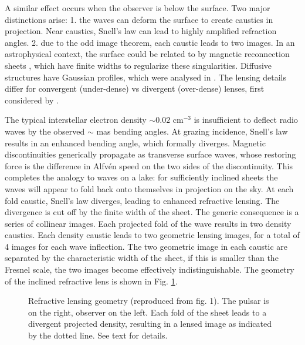 \documentclass[useAMS,usenatbib]{mn2e}
\begin{document}
A similar effect occurs when the
observer is below the surface.  Two major distinctions arise: 1. the
waves can deform the surface to create caustics in projection. Near
caustics, Snell's law can lead to highly amplified refraction
angles.  2. due to the odd image theorem, each caustic leads to two
images.  In an astrophysical context, the surface could be related to by magnetic reconnection
sheets \citep{2015MNRAS.450.3201B}, which have finite widths to
regularize these singularities. Diffusive structures have Gaussian
profiles, which were analysed in \citet{2012MNRAS.421L.132P}.  The
lensing details differ for convergent (under-dense) vs divergent
(over-dense) lenses, first considered by \citet{1998ApJ...496..253C}.



The typical interstellar electron density $\sim 0.02$ cm$^{-3}$ 
is insufficient to deflect
radio waves by the observed $\sim$ mas bending angles. At grazing
incidence, Snell's law results in an enhanced bending angle, which
formally diverges.  Magnetic discontinuities generically propagate
as transverse surface waves, whose restoring force is the difference in Alfv\'en
speed on the two sides of the discontinuity. This completes the
analogy to waves on a lake: for sufficiently inclined sheets the waves
will appear to fold back onto themselves in projection on the sky.  At
each fold caustic, Snell's law diverges, leading to enhanced
refractive lensing.  The divergence is cut off by the finite width of
the sheet.  The generic consequence is a series of collinear images.
Each projected fold of the wave results in two density caustics.  Each density
caustic leads to two geometric lensing images, for a total of 4 images
for each wave inflection.  The two geometric image in each caustic are
separated by the characteristic width of the sheet, if this is smaller
than the Fresnel scale, the two images become effectively
indistinguishable. 
The geometry of the inclined refractive lens is shown in Fig. \ref{fig:sheetgeom}.
\begin{figure}
\vspace{-0.5in}
\centerline{}
\vspace{-6.0in}
\caption{Refractive lensing geometry 
(reproduced from \citet{2014MNRAS.442.3338P}
  fig. 1).  The pulsar is on the right, observer on the left.  Each
  fold of the sheet leads to a divergent projected density, resulting
  in a lensed image as indicated by the dotted line. See text for details.
}
\label{fig:sheetgeom}
\end{figure}
\end{document}
